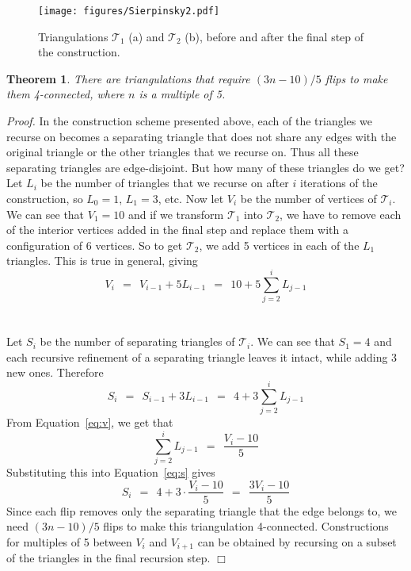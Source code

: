 \pdfoutput=1 \documentclass[12pt]{elsarticle}
\newtheorem{theo}[defin]{Theorem}
\newenvironment{theorem}{\begin{theo} \sl}{\end{theo}}
\newenvironment{proof}{\emph{Proof.}}{\hfill $\Box$ \medskip\\}
\begin{document}
\begin{figure}[ht]
 \centering
 \texttt{[image: figures/Sierpinsky2.pdf]}
 \caption{Triangulations $\mathcal{T}_1$ (a) and $\mathcal{T}_2$ (b), before and after the final step of the construction.}
 \label{fig:sierpinsky}
\end{figure}

\begin{theorem}
 There are triangulations that require $(3n - 10)/5$ flips to make them 4-connected, where $n$ is a multiple of 5.
\end{theorem}
\begin{proof}
 In the construction scheme presented above, each of the triangles we recurse on becomes a separating triangle that does not share any edges with the original triangle or the other triangles that we recurse on. Thus all these separating triangles are edge-disjoint. But how many of these triangles do we get? Let $L_i$ be the number of triangles that we recurse on after $i$ iterations of the construction, so $L_0 = 1$, $L_1 = 3$, etc. Now let $V_i$ be the number of vertices of $\mathcal{T}_i$. We can see that $V_1 = 10$ and if we transform $\mathcal{T}_1$ into $\mathcal{T}_2$, we have to remove each of the interior vertices added in the final step and replace them with a configuration of 6 vertices. So to get $\mathcal{T}_2$, we add 5 vertices in each of the $L_1$ triangles. This is true in general, giving
 \begin{equation}
  V_i~~=~~V_{i-1} + 5 L_{i-1}~~=~~10 + 5 \sum_{j=2}^{i} L_{j-1} \label{eq:v}
 \end{equation}
\\ \ \\
 Let $S_i$ be the number of separating triangles of $\mathcal{T}_i$. We can see that $S_1 = 4$ and each recursive refinement of a separating triangle leaves it intact, while adding 3 new ones. Therefore
 \begin{equation}
  S_i~~=~~S_{i-1} + 3 L_{i-1}~~=~~4 + 3 \sum_{j=2}^{i} L_{j-1} \label{eq:s}
 \end{equation}
 From Equation~\eqref{eq:v}, we get that 
 \[ \sum_{j=2}^{i} L_{j-1}~~=~~\frac{V_i - 10}{5} \]
 Substituting this into Equation~\eqref{eq:s} gives 
 \[ S_i~~=~~4 + 3 \cdot \frac{V_i - 10}{5}~~=~~\frac{3 V_i - 10}{5} \]
 Since each flip removes only the separating triangle that the edge belongs to, we need $(3n - 10)/5$ flips to make this triangulation 4-connected. Constructions for multiples of 5 between $V_i$ and $V_{i+1}$ can be obtained by recursing on a subset of the triangles in the final recursion step.
\end{proof}
\end{document}
